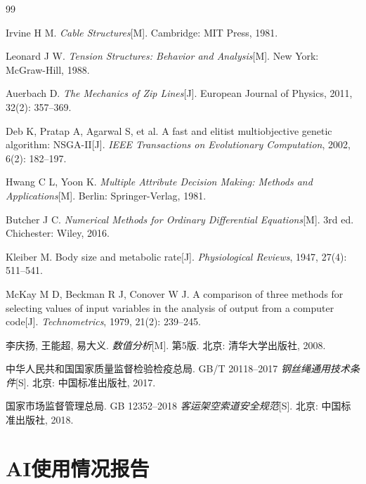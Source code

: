 \documentclass[12pt,a4paper]{ctexart}
\begin{document}
\begin{thebibliography}{99}

 Irvine H M. \textit{Cable Structures}[M]. Cambridge: MIT Press, 1981.

 Leonard J W. \textit{Tension Structures: Behavior and Analysis}[M]. New York: McGraw-Hill, 1988.

 Auerbach D. \textit{The Mechanics of Zip Lines}[J]. European Journal of Physics, 2011, 32(2): 357--369.

 Deb K, Pratap A, Agarwal S, et al. A fast and elitist multiobjective genetic algorithm: NSGA-II[J]. \textit{IEEE Transactions on Evolutionary Computation}, 2002, 6(2): 182--197.

 Hwang C L, Yoon K. \textit{Multiple Attribute Decision Making: Methods and Applications}[M]. Berlin: Springer-Verlag, 1981.

 Butcher J C. \textit{Numerical Methods for Ordinary Differential Equations}[M]. 3rd ed. Chichester: Wiley, 2016.

 Kleiber M. Body size and metabolic rate[J]. \textit{Physiological Reviews}, 1947, 27(4): 511--541.

 McKay M D, Beckman R J, Conover W J. A comparison of three methods for selecting values of input variables in the analysis of output from a computer code[J]. \textit{Technometrics}, 1979, 21(2): 239--245.

 李庆扬, 王能超, 易大义. \textit{数值分析}[M]. 第5版. 北京: 清华大学出版社, 2008.

 中华人民共和国国家质量监督检验检疫总局. GB/T 20118--2017 \textit{钢丝绳通用技术条件}[S]. 北京: 中国标准出版社, 2017.

 国家市场监督管理总局. GB 12352--2018 \textit{客运架空索道安全规范}[S]. 北京: 中国标准出版社, 2018.

\end{thebibliography}


\section*{AI使用情况报告}
\end{document}
